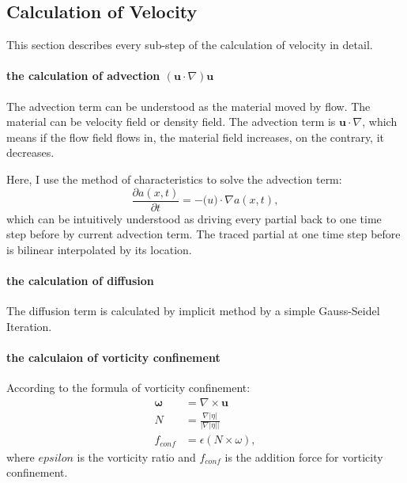 \documentclass[a4paper, 9pt]{extarticle}
\begin{document}
\subsection{Calculation of Velocity}
This section describes every sub-step of the calculation of velocity in detail. 
\paragraph{the calculation of advection $(\mathbf{u}\cdot\nabla)\mathbf{u}$}
The advection term can be understood as the material moved by flow. The material can be velocity field or density field. The advection term is $\mathbf{u}\cdot\nabla$, which means if the flow field flows in, the material field increases, on the contrary, it decreases.

Here, I use the method of characteristics to solve the advection term:
\begin{equation}
    \frac{\partial a(x, t)}{\partial t} = -\mathbf(u)\cdot \nabla a(x, t),
\end{equation}
which can be intuitively understood as driving every partial back to one time step before by current advection term. The traced partial at one time step before is bilinear interpolated by its location.
    
\paragraph{the calculation of diffusion}

The diffusion term is calculated by implicit method by a simple Gauss-Seidel Iteration.

\paragraph{the calculaion of vorticity confinement}

According to the formula of vorticity confinement:
\begin{equation}
    \begin{aligned}
    \mathbf{\omega} &= \nabla \times \mathbf{u} \\
    N &= \frac{\nabla \left| \eta \right|}{\left| \nabla \left| \eta \right| \right|} \\
    f_{conf} &= \epsilon (N\times \omega),
    \end{aligned}
\end{equation}
where $epsilon$ is the vorticity ratio and $f_{conf}$ is the addition force for vorticity confinement.
\end{document}
